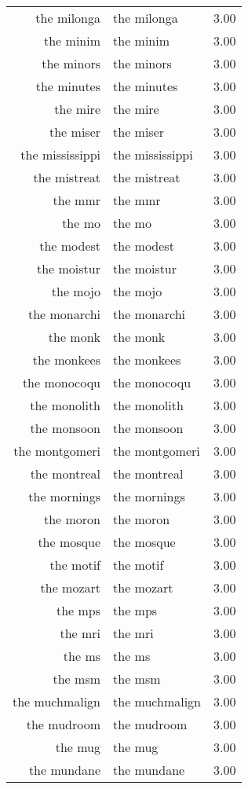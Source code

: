 \begin{table}[ht]
\begin{tabular}{rlr}
  the milonga & the milonga & 3.00 \\ 
  the minim & the minim & 3.00 \\ 
  the minors & the minors & 3.00 \\ 
  the minutes & the minutes & 3.00 \\ 
  the mire & the mire & 3.00 \\ 
  the miser & the miser & 3.00 \\ 
  the mississippi & the mississippi & 3.00 \\ 
  the mistreat & the mistreat & 3.00 \\ 
  the mmr & the mmr & 3.00 \\ 
  the mo & the mo & 3.00 \\ 
  the modest & the modest & 3.00 \\ 
  the moistur & the moistur & 3.00 \\ 
  the mojo & the mojo & 3.00 \\ 
  the monarchi & the monarchi & 3.00 \\ 
  the monk & the monk & 3.00 \\ 
  the monkees & the monkees & 3.00 \\ 
  the monocoqu & the monocoqu & 3.00 \\ 
  the monolith & the monolith & 3.00 \\ 
  the monsoon & the monsoon & 3.00 \\ 
  the montgomeri & the montgomeri & 3.00 \\ 
  the montreal & the montreal & 3.00 \\ 
  the mornings & the mornings & 3.00 \\ 
  the moron & the moron & 3.00 \\ 
  the mosque & the mosque & 3.00 \\ 
  the motif & the motif & 3.00 \\ 
  the mozart & the mozart & 3.00 \\ 
  the mps & the mps & 3.00 \\ 
  the mri & the mri & 3.00 \\ 
  the ms & the ms & 3.00 \\ 
  the msm & the msm & 3.00 \\ 
  the muchmalign & the muchmalign & 3.00 \\ 
  the mudroom & the mudroom & 3.00 \\ 
  the mug & the mug & 3.00 \\ 
  the mundane & the mundane & 3.00 \\ 

\end{tabular}
\end{table}
